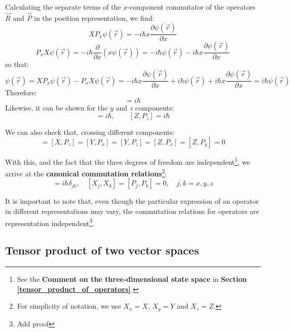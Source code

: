 Calculating the separate terms of the $x$-component commutator of the operators $\vec{R}$ and $\vec{P}$ in the position representation, we find:
\begin{equation}
    XP_x\psi(\vec{r}) = -i\hbar x \frac{\partial \psi(\vec{r})}{\partial x}
\end{equation}
\begin{equation}
    P_xX\psi(\vec{r}) = -i\hbar \frac{\partial}{\partial x}(x\psi(\vec{r})) = -i\hbar \psi(\vec{r}) - i \hbar x \frac{\partial \psi(\vec{r})}{\partial x}
\end{equation}
so that:
\begin{equation}
    [X,P_x]\psi(\vec{r}) = XP_x\psi(\vec{r}) - P_xX\psi(\vec{r}) = -i\hbar x \frac{\partial \psi(\vec{r})}{\partial x} + i\hbar \psi(\vec{r}) + i\hbar x \frac{\partial \psi(\vec{r})}{\partial x} = i\hbar \psi(\vec{r})
\end{equation}
Therefore:
\begin{equation}
    [X,P_x] = i\hbar
\end{equation}
Likewise, it can be shown for the $y$ and $z$ components:
\begin{equation}
    [Y,P_y] = i\hbar, \qquad [Z,P_z] = i\hbar
\end{equation}

We can also check that, crossing different components:
\begin{equation}
    [X, P_y] = [X, P_z] = [Y, P_x] = [Y, P_z] = [Z, P_x] = [Z, P_y] = 0
\end{equation}

With this, and the fact that the three degrees of freedom are independent\footnote{See the \textbf{Comment on the three-dimensional state space} in \textbf{Section \ref{tensor_product_of_operators}}.}, we arrive at the \textbf{canonical commutation relations}\footnote{For simplicity of notation, we use $X_x= X$, $X_y=Y$ and $X_z=Z$.}:
\begin{equation}
    [X_j, P_k] = i\hbar \delta_{jk}, \quad [X_j, X_k] = [P_j, P_k] = 0, \quad j,k = x,y,z
\end{equation}

It is important to note that, even though the particular expression of an operator in different representations may vary, the commutation relations for operators are representation independent\footnote{\color{red} Add proof}.

\subsection{Tensor product of two vector spaces}


